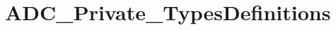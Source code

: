 \hypertarget{group___a_d_c___private___types_definitions}{\section{A\-D\-C\-\_\-\-Private\-\_\-\-Types\-Definitions}
\label{group___a_d_c___private___types_definitions}
}
